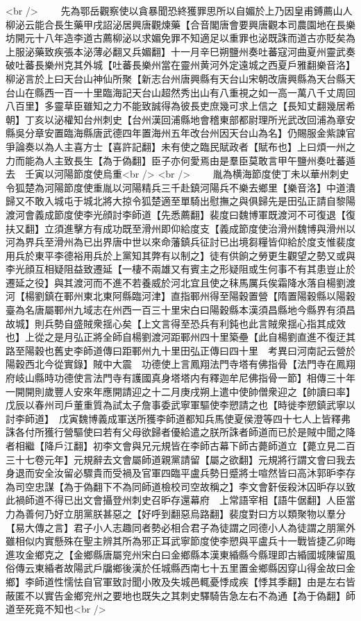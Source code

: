 <br />
　　先為鄂岳觀察使以貪暴聞恐終獲罪思所以自媚於上乃因皇甫鎛薦山人柳泌云能合長生藥甲戌詔泌居興唐觀煉藥【合音閣唐會要興唐觀本司農園地在長樂坊開元十八年造李道古薦柳泌以求媚免罪不知適足以重罪也泌既誅而道古亦貶矣為上服泌藥致疾張本泌薄必翻又兵媚翻】十一月辛巳朔鹽州奏吐蕃寇河曲夏州靈武奏破吐蕃長樂州克其外城【吐蕃長樂州當在靈州黄河外定遠城之西夏戶雅翻樂音洛】柳泌言於上曰天台山神仙所聚【新志台州唐興縣有天台山宋朝改唐興縣為天台縣天台山在縣西一百一十里臨海記天台山超然秀出山有八重視之如一高一萬八千丈周回八百里】多靈草臣雖知之力不能致誠得為彼長吏庶幾可求上信之【長知丈翻幾居希朝】丁亥以泌權知台州刺史【台州漢回浦縣地會稽東部都尉理所光武改回浦為章安縣吳分章安置臨海縣唐武德四年置海州五年改台州因天台山為名】仍賜服金紫諫官爭論奏以為人主喜方士【喜許記翻】未有使之臨民賦政者【賦布也】上曰煩一州之力而能為人主致長生【為于偽翻】臣子亦何愛焉由是羣臣莫敢言甲午鹽州奏吐蕃遁去　壬寅以河陽節度使烏重<br />
<br />
　　胤為横海節度使丁未以華州刺史令狐楚為河陽節度使重胤以河陽精兵三千赴鎮河陽兵不樂去鄉里【樂音洛】中道潰歸又不敢入城屯于城北將大掠令狐楚適至單騎出慰撫之與俱歸先是田弘正請自黎陽渡河會義成節度使李光顔討李師道【先悉薦翻】裴度曰魏博軍既渡河不可復退【復扶又翻】立須進擊方有成功既至滑州即仰給度支【義成節度使治滑州魏博與滑州以河為界兵至滑州為已出界唐中世以來命藩鎮兵征討已出境芻糧皆仰給於度支惟裴度用兵於東平李德裕用兵於上黨知其弊有以制之】徒有供餉之勞更生觀望之勢又或與李光顔互相疑阻益致遷延【一棲不兩雄又有賓主之形疑阻或生何事不有其患豈止於遷延之役】與其渡河而不進不若養威於河北宜且使之秣馬厲兵俟霜降水落自楊劉渡河【楊劉鎮在鄆州東北東阿縣臨河津】直指鄆州得至陽穀置營【隋置陽穀縣以陽穀臺為名唐屬鄆州九域志在州西一百三十里宋白曰陽穀縣本漢須昌縣地今縣界有須昌故城】則兵勢自盛賊衆揺心矣【上文言得至恐兵有利鈍也此言賊衆揺心指其成效也】上從之是月弘正將全師自楊劉渡河距鄆州四十里築壘【此自楊劉直進不復迂其路至陽穀也舊史李師道傳曰距鄆州九十里田弘正傳曰四十里　考異曰河南記云營於陽穀西北今從實錄】賊中大震　功德使上言鳳翔法門寺塔有佛指骨【法門寺在鳳翔府岐山縣時功德使言法門寺有護國真身塔塔内有釋迦牟尼佛指骨一節】相傳三十年一開開則歲豐人安來年應開請迎之十二月庚戌朔上遣中使帥僧衆迎之【帥讀曰率】　戊辰以春州司戶董重質為試太子詹事委武寧軍驅使李愬請之也【時徙李愬鎮武寧以討李師道】　戊寅魏博義成軍送所獲李師道都知兵馬使夏侯澄等四十七人上皆釋弗誅各付所獲行營驅使曰若有父母欲歸者優給遣之朕所誅者師道而已於是賊中聞之降者相繼【降戶江翻】初李文會與兄元規皆在李師古幕下師古薨師道立【薨立見二百三十七卷元年】元規辭去文會屬師道親黨請留【屬之欲翻】元規將行謂文會曰我去身退而安全汝留必驟貴而受禍及官軍四臨平盧兵勢日蹙將士喧然皆曰高沐郭昈李存為司空忠謀【為于偽翻下不為同師道檢校司空故稱之】李文會姧佞殺沐囚昈存以致此禍師道不得已出文會攝登州刺史召昈存還幕府　上常語宰相【語牛倨翻】人臣當力為善何乃好立朋黨朕甚惡之【好呼到翻惡烏路翻】裴度對曰方以類聚物以羣分【易大傳之言】君子小人志趣同者勢必相合君子為徒謂之同德小人為徒謂之朋黨外雖相似内實懸殊在聖主辨其所為邪正耳武寧節度使李愬與平盧兵十一戰皆捷乙卯晦進攻金鄉克之【金鄉縣唐屬兖州宋白曰金鄉縣本漢東緍縣今縣理即古緍國城陳留風俗傳云東緍者故陽武戶牖鄉後漢於任城縣西南七十五里置金鄉縣因穿山得金故曰金鄉】李師道性懦怯自官軍致討聞小敗及失城邑輒憂悸成疾【悸其季翻】由是左右皆蔽匿不以實告金鄉兖州之要地也既失之其刺史驛騎告急左右不為通【為于偽翻】師道至死竟不知也<br />
